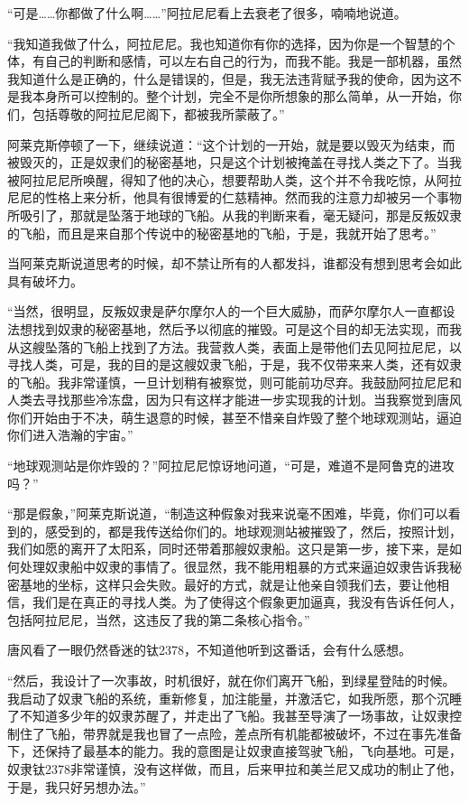 “可是……你都做了什么啊……”阿拉尼尼看上去衰老了很多，喃喃地说道。 

“我知道我做了什么，阿拉尼尼。我也知道你有你的选择，因为你是一个智慧的个体，有自己的判断和感情，可以左右自己的行为，而我不能。我是一部机器，虽然我知道什么是正确的，什么是错误的，但是，我无法违背赋予我的使命，因为这不是我本身所可以控制的。整个计划，完全不是你所想象的那么简单，从一开始，你们，包括尊敬的阿拉尼尼阁下，都被我所蒙蔽了。” 

阿莱克斯停顿了一下，继续说道：“这个计划的一开始，就是要以毁灭为结束，而被毁灭的，正是奴隶们的秘密基地，只是这个计划被掩盖在寻找人类之下了。当我被阿拉尼尼所唤醒，得知了他的决心，想要帮助人类，这个并不令我吃惊，从阿拉尼尼的性格上来分析，他具有很博爱的仁慈精神。然而我的注意力却被另一个事物所吸引了，那就是坠落于地球的飞船。从我的判断来看，毫无疑问，那是反叛奴隶的飞船，而且是来自那个传说中的秘密基地的飞船，于是，我就开始了思考。” 

当阿莱克斯说道思考的时候，却不禁让所有的人都发抖，谁都没有想到思考会如此具有破坏力。 

“当然，很明显，反叛奴隶是萨尔摩尔人的一个巨大威胁，而萨尔摩尔人一直都设法想找到奴隶的秘密基地，然后予以彻底的摧毁。可是这个目的却无法实现，而我从这艘坠落的飞船上找到了方法。我营救人类，表面上是带他们去见阿拉尼尼，以寻找人类，可是，我的目的是这艘奴隶飞船，于是，我不仅带来来人类，还有奴隶的飞船。我非常谨慎，一旦计划稍有被察觉，则可能前功尽弃。我鼓励阿拉尼尼和人类去寻找那些冷冻盘，因为只有这样才能进一步实现我的计划。当我察觉到唐风你们开始由于不决，萌生退意的时候，甚至不惜亲自炸毁了整个地球观测站，逼迫你们进入浩瀚的宇宙。” 

“地球观测站是你炸毁的？”阿拉尼尼惊讶地问道，“可是，难道不是阿鲁克的进攻吗？” 

“那是假象，”阿莱克斯说道，“制造这种假象对我来说毫不困难，毕竟，你们可以看到的，感受到的，都是我传送给你们的。地球观测站被摧毁了，然后，按照计划，我们如愿的离开了太阳系，同时还带着那艘奴隶船。这只是第一步，接下来，是如何处理奴隶船中奴隶的事情了。很显然，我不能用粗暴的方式来逼迫奴隶告诉我秘密基地的坐标，这样只会失败。最好的方式，就是让他亲自领我们去，要让他相信，我们是在真正的寻找人类。为了使得这个假象更加逼真，我没有告诉任何人，包括阿拉尼尼，当然，这违反了我的第二条核心指令。” 

唐风看了一眼仍然昏迷的钛2378，不知道他听到这番话，会有什么感想。 

“然后，我设计了一次事故，时机很好，就在你们离开飞船，到绿星登陆的时候。我启动了奴隶飞船的系统，重新修复，加注能量，并激活它，如我所愿，那个沉睡了不知道多少年的奴隶苏醒了，并走出了飞船。我甚至导演了一场事故，让奴隶控制住了飞船，带界就是我也冒了一点险，差点所有机能都被破坏，不过在事先准备下，还保持了最基本的能力。我的意图是让奴隶直接驾驶飞船，飞向基地。可是，奴隶钛2378非常谨慎，没有这样做，而且，后来甲拉和美兰尼又成功的制止了他，于是，我只好另想办法。” 

